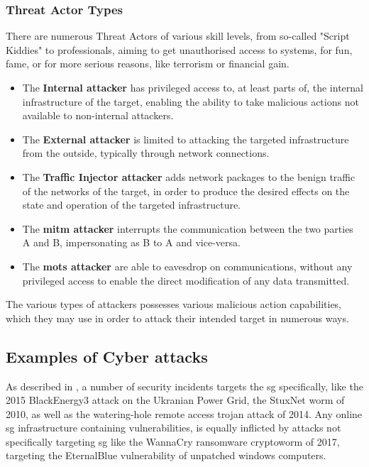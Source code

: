 \subsubsection{Threat Actor  Types}
There are numerous Threat Actors of various skill levels, from so-called "Script Kiddies" to professionals, aiming to get unauthorised access to systems, for fun, fame, or for more serious reasons, like terrorism or financial gain. 

\begin{itemize}
    \item The \textbf{Internal attacker} has privileged access to, at least parts of, the internal infrastructure of the target, enabling the ability to take malicious actions not available to non-internal attackers.
    \item The \textbf{External attacker} is limited to attacking the targeted infrastructure from the outside, typically through network connections.
    \item The \textbf{Traffic Injector attacker} adds network packages to the benign traffic of the networks of the target, in order to produce the desired effects on the state and operation of the targeted infrastructure. 
    \item The \textbf{\acrshort{mitm} attacker} interrupts the communication between the two parties A and B, impersonating as B to A and vice-versa.
    \item The  \textbf{\acrshort{mots} attacker} are able to eavesdrop on communications, without any privileged access to enable the direct modification of any data transmitted.
\end{itemize}



The various types of attackers possesses various malicious action capabilities, which they may use in order to attack their intended target in numerous ways.












\subsection{Examples of Cyber attacks}
As described in \cite{sundararajan2019survey}, a number of security incidents targets the \acrshort{sg} specifically, like the 2015 BlackEnergy3 attack on the Ukranian  Power Grid, the StuxNet worm of 2010, as well as the watering-hole remote access trojan attack of 2014. 
Any online \acrshort{sg} infrastructure containing vulnerabilities, is equally inflicted by attacks not specifically targeting \acrfull{sg} like the WannaCry ransomware cryptoworm of 2017, targeting the EternalBlue vulnerability of unpatched windows computers.



